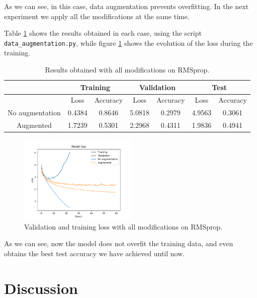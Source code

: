 \documentclass[]{article}
\begin{document}
As we can see, in this case, data augmentation prevents overfitting. In the next experiment we apply all the modifications at the same time.

Table \ref{t:rms2} shows the results obtained in each case, using the script \texttt{data\_augmentation.py}, while figure \ref{f:rms2} shows the evolution of the loss during the training.

\begin{table}[H]
	\centering
	\label{t:rms2}
	\begin{tabular}{@{}ccccccc@{}}
		\toprule
		& \multicolumn{2}{c}{Training} & \multicolumn{2}{c}{Validation} & \multicolumn{2}{c}{Test} \\ \midrule
		& Loss         & Accuracy      & Loss          & Accuracy       & Loss       & Accuracy    \\
		\midrule
		No augmentation & 0.4384       & 0.8646        & 5.0818        & 0.2979         & 4.9563     & 0.3061      \\
		Augmented       & 1.7239       & 0.5301        & 2.2968        & 0.4311         & 1.9836     & 0.4941      \\ \bottomrule
	\end{tabular}
	\caption{Results obtained with all modifications on RMSprop.}
\end{table}

\begin{figure}[H]
	\centering
	\includegraphics[width=0.5\textwidth]{last2_loss}
	\caption{Validation and training loss with all modifications on RMSprop.}
	\label{f:rms2}
\end{figure}

As we can see, now the model does not overfit the training data, and even obtains the best test accuracy we have achieved until now.

\section{Discussion}
\end{document}
